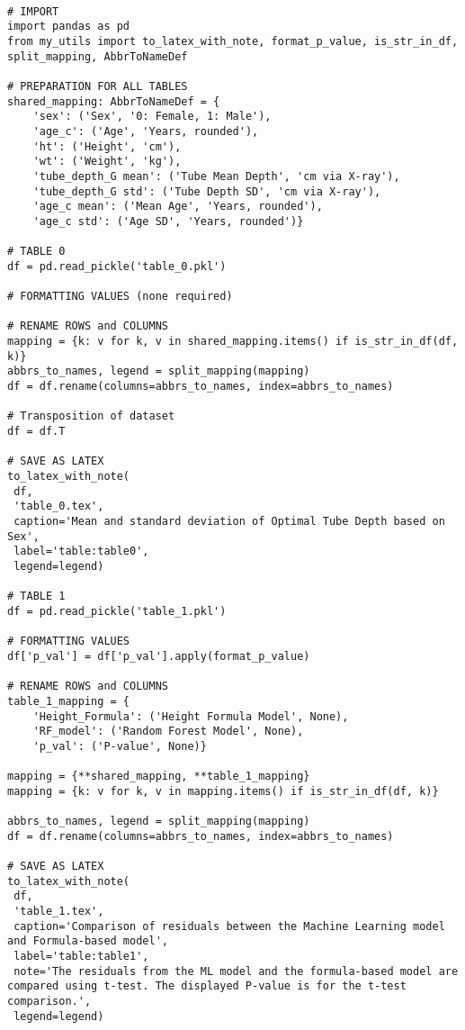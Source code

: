 \documentclass[11pt]{article}
\begin{document}
\begin{verbatim}

# IMPORT
import pandas as pd
from my_utils import to_latex_with_note, format_p_value, is_str_in_df, split_mapping, AbbrToNameDef

# PREPARATION FOR ALL TABLES
shared_mapping: AbbrToNameDef = {
    'sex': ('Sex', '0: Female, 1: Male'),
    'age_c': ('Age', 'Years, rounded'),
    'ht': ('Height', 'cm'),
    'wt': ('Weight', 'kg'),
    'tube_depth_G mean': ('Tube Mean Depth', 'cm via X-ray'),
    'tube_depth_G std': ('Tube Depth SD', 'cm via X-ray'),
    'age_c mean': ('Mean Age', 'Years, rounded'),
    'age_c std': ('Age SD', 'Years, rounded')}
    
# TABLE 0
df = pd.read_pickle('table_0.pkl')

# FORMATTING VALUES (none required)

# RENAME ROWS and COLUMNS
mapping = {k: v for k, v in shared_mapping.items() if is_str_in_df(df, k)} 
abbrs_to_names, legend = split_mapping(mapping)
df = df.rename(columns=abbrs_to_names, index=abbrs_to_names)

# Transposition of dataset
df = df.T

# SAVE AS LATEX
to_latex_with_note(
 df,
 'table_0.tex',
 caption='Mean and standard deviation of Optimal Tube Depth based on Sex',
 label='table:table0',
 legend=legend)

# TABLE 1
df = pd.read_pickle('table_1.pkl')

# FORMATTING VALUES 
df['p_val'] = df['p_val'].apply(format_p_value)

# RENAME ROWS and COLUMNS
table_1_mapping = {
    'Height_Formula': ('Height Formula Model', None),
    'RF_model': ('Random Forest Model', None),
    'p_val': ('P-value', None)}
    
mapping = {**shared_mapping, **table_1_mapping}
mapping = {k: v for k, v in mapping.items() if is_str_in_df(df, k)} 

abbrs_to_names, legend = split_mapping(mapping)
df = df.rename(columns=abbrs_to_names, index=abbrs_to_names)

# SAVE AS LATEX
to_latex_with_note(
 df,
 'table_1.tex',
 caption='Comparison of residuals between the Machine Learning model and Formula-based model',
 label='table:table1',
 note='The residuals from the ML model and the formula-based model are compared using t-test. The displayed P-value is for the t-test comparison.',
 legend=legend)

\end{verbatim}
\end{document}
